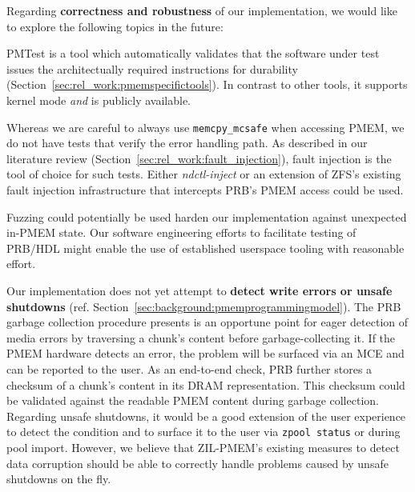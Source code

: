 \documentclass[12pt,a4paper,twoside]{book}
\begin{document}
\begin{samepage}
Regarding \textbf{correctness and robustness} of our implementation, we would like to explore the following topics in the future:
\begin{description}[noitemsep,leftmargin=1.5cm,labelindent=1cm]
    \item[Validating PMEM Durability] PMTest is a tool which automatically validates that the software under test issues the architectually required instructions for durability (Section~\ref{sec:rel_work:pmemspecifictools}).
        In contrast to other tools, it supports kernel mode \textit{and} is publicly available.

    \item[Fault Injection for PMEM Access] Whereas we are careful to always use \lstinline{memcpy_mcsafe} when accessing PMEM, we do not have tests that verify the error handling path.
        As described in our literature review (Section~\ref{sec:rel_work:fault_injection}), fault injection is the tool of choice for such tests.
        Either \textit{ndctl-inject} or an extension of ZFS's existing fault injection infrastructure that intercepts PRB's PMEM access could be used.

    \item[Fuzzing] Fuzzing could potentially be used harden our implementation against unexpected in-PMEM state.
        Our software engineering efforts to facilitate testing of PRB/HDL might enable the use of established userspace tooling with reasonable effort.
\end{description}
\end{samepage}

Our implementation does not yet attempt to \textbf{detect write errors or unsafe shutdowns} (ref. Section~\ref{sec:background:pmemprogrammingmodel}).
The PRB garbage collection procedure presents is an opportune point for eager detection of media errors by traversing a chunk's content before garbage-collecting it.
If the PMEM hardware detects an error, the problem will be surfaced via an MCE and can be reported to the user.
As an end-to-end check, PRB further stores a checksum of a chunk's content in its DRAM representation. This checksum could be validated against the readable PMEM content during garbage collection.
Regarding unsafe shutdowns, it would be a good extension of the user experience to detect the condition and to surface it to the user via \lstinline{zpool status} or during pool import.
However, we believe that ZIL-PMEM's existing measures to detect data corruption should be able to correctly handle problems caused by unsafe shutdowns on the fly.
\end{document}

